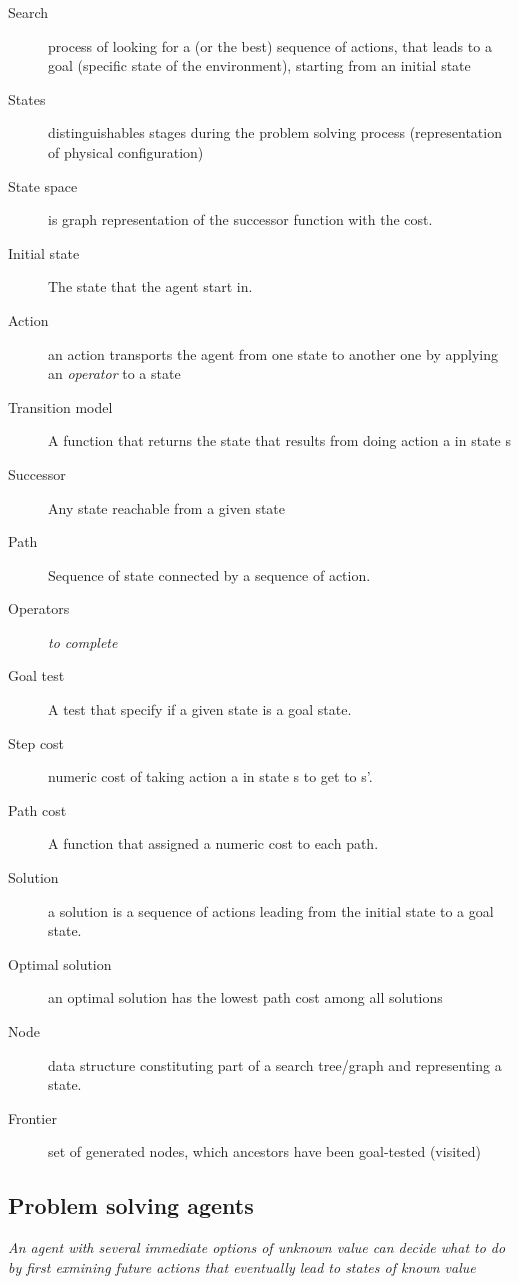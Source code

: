 \begin{description}
    \item[Search] process of looking for a (or the best) sequence of actions, that leads to a goal (specific state of the environment), starting from an initial state
    \item[States] distinguishables stages during the problem solving process (representation of physical configuration)
    \item[State space] is graph representation of the successor function with the cost.
    \item[Initial state] The state that the agent start in.
    \item[Action] an action transports the agent from one state to another one by applying an \textit{operator} 
    to a state
    \item[Transition model] A function that returns the state that results from doing action a in state s
    \item[Successor] Any state reachable from a given state
    \item[Path] Sequence of state connected by a sequence of action.
    \item[Operators] \textit{to complete}
    \item[Goal test] A test that specify if a given state is a goal state.
    \item[Step cost] numeric cost of taking action a in state s to get to s'.
    \item[Path cost] A function that assigned a numeric cost to each path.
    \item[Solution] a solution is a sequence of actions leading from the initial state to a goal state.
    \item[Optimal solution] an optimal solution has the lowest path cost among all solutions
    \item[Node] data structure constituting part of a search tree/graph and representing a state.
    \item[Frontier] set of generated nodes, which ancestors have been goal-tested (visited)
\end{description}

\subsection{Problem solving agents}

\textit{An  agent with  several immediate  options of  unknown value  can
decide what to do by first  exmining future actions that eventually lead
to states of known value}

